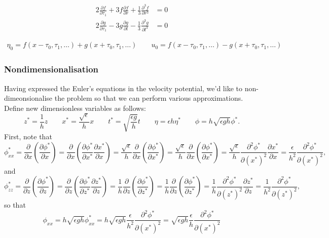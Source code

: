 \documentclass[10pt,reqno,oneside,a4paper]{article}
\begin{document}
\begin{align*}
2 \frac{\partial f}{\partial \tau_1} + 3 f \frac{\partial f}{\partial r} + \frac{1}{3}\frac{\partial^3 f}{\partial r^3} &= 0 \\
2 \frac{\partial g}{\partial \tau_1} - 3 g \frac{\partial g}{\partial l} - \frac{1}{3}\frac{\partial^3 g}{\partial l^3} &= 0 
\end{align*}

\begin{align*}
\eta_0 = f(x - \tau_0, \tau_1, \ldots) +  g(x + \tau_0, \tau_1, \ldots) \qquad u_0 = f(x - \tau_0, \tau_1, \ldots) -  g(x + \tau_0, \tau_1, \ldots)
\end{align*}

\subsubsection{Nondimensionalisation}
Having expressed the Euler's equations in the velocity potential, we'd like to non-dimeonsionalise the problem so that we can perform various approximations. Define new dimensionless variables as follows:
\[ 
z^* = \frac{1}{h}z \qquad x^* = \frac{\sqrt{\epsilon}}{h}x \qquad t^* = \sqrt{\frac{\epsilon g}{h}}t \qquad \eta = \epsilon h \eta^* \qquad \phi  = h\sqrt{\epsilon g h} \phi^*.
\]
First, note that 
\[ 
\phi^*_{xx} = \frac{\partial}{\partial x} \left( \frac{\partial \phi^*}{\partial x}\right) = \frac{\partial}{\partial x} \left( \frac{\partial \phi^*}{\partial x^*} \frac{\partial x^*}{\partial x}\right) =  \frac{\sqrt{\epsilon}}{h} \frac{\partial}{\partial x} \left( \frac{\partial \phi^*}{\partial x^*}\right) = \frac{\sqrt{\epsilon}}{h} \frac{\partial}{\partial x} \left( \frac{\partial \phi^*}{\partial x^*}\right) = \frac{\sqrt{\epsilon}}{h} \frac{\partial^2 \phi^*}{\partial (x^*)^2} \frac{\partial x^*}{\partial x} = \frac{\epsilon}{h^2}\frac{\partial^2 \phi^*}{\partial (x^*)^2},
\]
and
\[ 
\phi^*_{zz} = \frac{\partial}{\partial z} \left( \frac{\partial \phi^*}{\partial z}\right) = \frac{\partial}{\partial z} \left( \frac{\partial \phi^*}{\partial z^*} \frac{\partial z^*}{\partial z}\right) =  \frac{1}{h} \frac{\partial}{\partial z} \left(\frac{\partial \phi^*}{\partial z^*}\right) = \frac{1}{h} \frac{\partial}{\partial z} \left( \frac{\partial \phi^*}{\partial z^*}\right) = \frac{1}{h} \frac{\partial^2 \phi^*}{\partial (z^*)^2} \frac{\partial z^*}{\partial z} = \frac{1}{h^2}\frac{\partial^2 \phi^*}{\partial (z^*)^2},
\]
so that 
\[ 
\phi_{xx} = h\sqrt{\epsilon g h} \phi^*_{xx} = h\sqrt{\epsilon g h} \frac{\epsilon}{h^2}\frac{\partial^2 \phi^*}{\partial (x^*)^2}  = \sqrt{\epsilon g h} \frac{\epsilon}{h}\frac{\partial^2 \phi^*}{\partial (x^*)^2} 
\]
\end{document}
